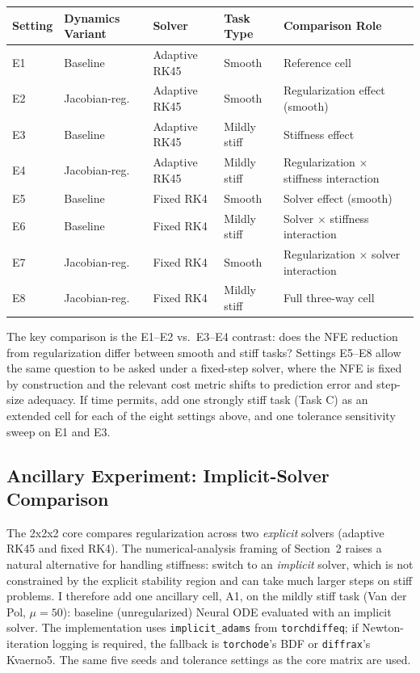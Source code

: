 \documentclass[11pt]{article}
\begin{document}
\begin{center}
\begin{tabular}{lllll}
\toprule
Setting & Dynamics Variant & Solver & Task Type & Comparison Role \\
\midrule
E1 & Baseline       & Adaptive RK45 & Smooth       & Reference cell \\
E2 & Jacobian-reg.  & Adaptive RK45 & Smooth       & Regularization effect (smooth) \\
E3 & Baseline       & Adaptive RK45 & Mildly stiff & Stiffness effect \\
E4 & Jacobian-reg.  & Adaptive RK45 & Mildly stiff & Regularization $\times$ stiffness interaction \\
E5 & Baseline       & Fixed RK4     & Smooth       & Solver effect (smooth) \\
E6 & Baseline       & Fixed RK4     & Mildly stiff & Solver $\times$ stiffness interaction \\
E7 & Jacobian-reg.  & Fixed RK4     & Smooth       & Regularization $\times$ solver interaction \\
E8 & Jacobian-reg.  & Fixed RK4     & Mildly stiff & Full three-way cell \\
\bottomrule
\end{tabular}
\end{center}
The key comparison is the E1--E2 vs.\ E3--E4 contrast: does the NFE reduction from regularization differ between smooth and stiff tasks? Settings E5--E8 allow the same question to be asked under a fixed-step solver, where the NFE is fixed by construction and the relevant cost metric shifts to prediction error and step-size adequacy. If time permits, add one strongly stiff task (Task C) as an extended cell for each of the eight settings above, and one tolerance sensitivity sweep on E1 and E3.

\subsection{Ancillary Experiment: Implicit-Solver Comparison}
\label{sec:ancillary-implicit}

The 2x2x2 core compares regularization across two \emph{explicit} solvers (adaptive RK45 and fixed RK4). The numerical-analysis framing of Section~2 raises a natural alternative for handling stiffness: switch to an \emph{implicit} solver, which is not constrained by the explicit stability region and can take much larger steps on stiff problems. I therefore add one ancillary cell, A1, on the mildly stiff task (Van der Pol, $\mu = 50$): baseline (unregularized) Neural ODE evaluated with an implicit solver. The implementation uses \texttt{implicit\_adams} from \texttt{torchdiffeq}; if Newton-iteration logging is required, the fallback is \texttt{torchode}'s BDF or \texttt{diffrax}'s Kvaerno5. The same five seeds and tolerance settings as the core matrix are used.
\end{document}
